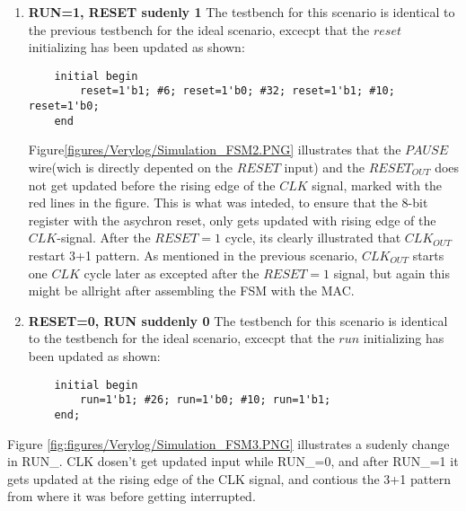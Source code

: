 \begin{enumerate}
    \item \textbf{RUN=1, RESET sudenly 1}
    The testbench for this scenario is identical to the previous testbench for the ideal scenario, excecpt that the $reset$ initializing has been updated as shown:
\begin{lstlisting} 
	initial begin
		reset=1'b1; #6; reset=1'b0; #32; reset=1'b1; #10; reset=1'b0;
	end	
\end{lstlisting}
Figure\ref{figures/Verylog/Simulation_FSM2.PNG} illustrates that the $PAUSE$ wire(wich is directly depented on the $RESET$ input) and the $RESET_{OUT}$ does not get updated before the rising edge of the $CLK$ signal, marked with the red lines in the figure. This is what was inteded, to ensure that the 8-bit register with the asychron reset, only gets updated with rising edge of the $CLK$-signal. After the $RESET=1$ cycle, its clearly illustrated that $CLK_{OUT}$ restart 3+1 pattern. As mentioned in the previous scenario, $CLK_{OUT}$ starts one $CLK$ cycle later as excepted after the $RESET=1$ signal, but again this might be allright after assembling the FSM with the MAC.
\item \textbf{RESET=0, RUN suddenly 0}
    The testbench for this scenario is identical to the testbench for the ideal scenario, excecpt that the $run$ initializing has been updated as shown:
\begin{lstlisting} 
	initial begin
		run=1'b1; #26; run=1'b0; #10; run=1'b1;	
	end;
\end{lstlisting}

\end{enumerate}
Figure \ref{fig:figures/Verylog/Simulation_FSM3.PNG} illustrates a sudenly change in RUN_.  CLK dosen't get updated input while RUN_=0, and after RUN_=1 it gets updated at the rising edge of the CLK signal, and contious the 3+1 pattern from where it was before getting interrupted. 